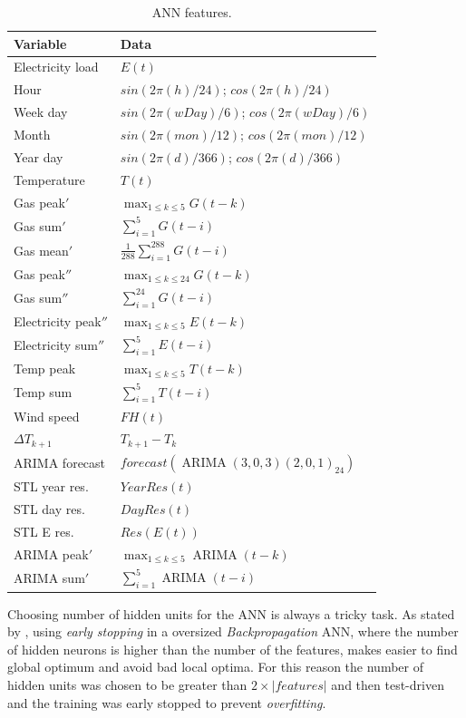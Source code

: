 \documentclass{sig-alternate-sigmod07}
\begin{document}
\begin{table}
\centering
\label{tab:ANNinputs}
\begin{tabular}{ll} \hline
Variable			& Data\\ \hline
Electricity load 		& $E(t)$ \\ 
Hour				& $sin(2\pi(h)/24)$; $cos(2\pi(h)/24)$\\
Week day			& $sin(2\pi(wDay)/6)$; $cos(2\pi(wDay)/6)$ \\
Month			& $sin(2\pi(mon)/12)$; $cos(2\pi(mon)/12)$ \\
Year day			& $sin(2\pi(d)/366)$; $cos(2\pi(d)/366)$ \\
Temperature		& $T(t)$ \\
Gas peak$'$		& $\max_{1 \leq k \leq 5}G(t-k)$ \\
Gas sum$'$		& $\sum_{i=1}^{5} G(t-i)$ \\
Gas mean$'$		& $\frac{1}{288}\sum_{i=1}^{288} G(t-i)$ \\
Gas peak$''$		& $\max_{1 \leq k \leq 24}G(t-k)$ \\
Gas sum$''$		& $\sum_{i=1}^{24} G(t-i)$ \\
Electricity peak$''$	& $\max_{1 \leq k \leq 5}E(t-k)$ \\
Electricity sum$''$	& $\sum_{i=1}^{5} E(t-i)$ \\
Temp peak			& $\max_{1 \leq k \leq 5}T(t-k)$ \\
Temp sum			& $\sum_{i=1}^{5} T(t-i)$ \\
Wind speed		& $FH(t)$ \\
$\Delta T_{k+1}$	& $T_{k+1} - T_{k}$ \\
ARIMA forecast		& $forecast(\operatorname{ARIMA}(3,0,3)(2,0,1)_{24})$ \\
STL year res.		& $YearRes(t)$ \\
STL day res.		& $DayRes(t)$ \\
STL E res.			& $Res(E(t))$ \\
ARIMA peak$'$		& $\max_{1 \leq k \leq 5}\operatorname{ARIMA}(t-k)$ \\
ARIMA sum$'$		& $\sum_{i=1}^{5} \operatorname{ARIMA}(t-i)$ \\
\hline
\end{tabular}
\caption{ANN features.}
\end{table}

Choosing number of hidden units for the ANN is always a tricky task. As stated by \cite{lawrence1998size, sarle1995stopped}, using \emph{early stopping} in a oversized \emph{Backpropagation} ANN, where the number of hidden neurons is higher than the number of the features, makes easier to find global optimum and avoid bad local optima. For this reason the number of hidden units was chosen to be greater than $2\times |features|$ and then test-driven and the training was early stopped to prevent \emph{overfitting}.
\end{document}
